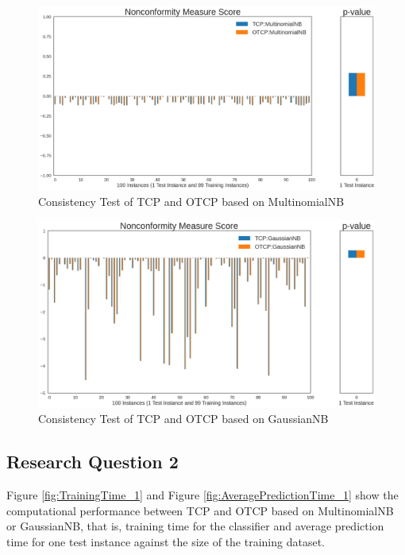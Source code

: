 \documentclass[10pt]{reportMaster}
\begin{document}
\begin{figure}[H]
    \centering
    \includegraphics[width = 13cm]{figures/ConsistencyTest_1.png}
    \caption{Consistency Test of TCP and OTCP based on MultinomialNB}
    \label{fig:ConsistencyTest_1}
\end{figure}

\begin{figure}[H]
    \centering
    \includegraphics[width = 13cm]{figures/ConsistencyTest_2.png}
    \caption{Consistency Test of TCP and OTCP based on GaussianNB}
    \label{fig:ConsistencyTest_2}
\end{figure}

\subsection{Research Question 2}

Figure \ref{fig:TrainingTime_1} and Figure \ref{fig:AveragePredictionTime_1} show the computational performance between TCP and OTCP based on MultinomialNB or GaussianNB, that is, training time for the classifier and average prediction time for one test instance against the size of the training dataset.\\
\end{document}
